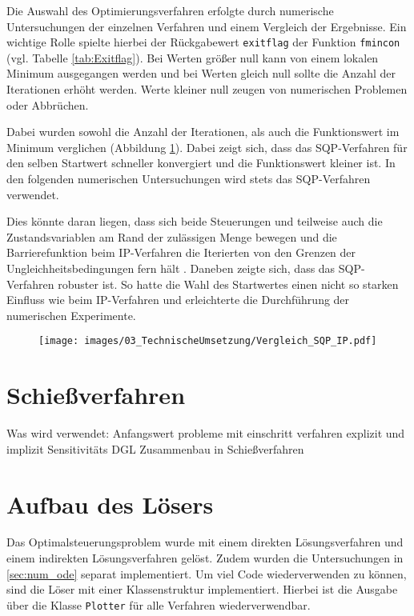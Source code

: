 Die Auswahl des Optimierungsverfahren erfolgte durch numerische Untersuchungen der einzelnen Verfahren und einem Vergleich der Ergebnisse. Ein wichtige Rolle spielte hierbei der Rückgabewert \texttt{exitflag} der Funktion \texttt{fmincon} (vgl. Tabelle \ref{tab:Exitflag}). Bei Werten größer null kann von einem lokalen Minimum ausgegangen werden und bei Werten gleich null sollte die Anzahl der Iterationen erhöht werden. Werte kleiner null zeugen von numerischen Problemen oder Abbrüchen.

 Dabei wurden sowohl die Anzahl der Iterationen, als auch die Funktionswert im Minimum verglichen (Abbildung \ref{img:Vergleich_SQP_IP}). Dabei zeigt sich, dass das SQP-Verfahren für den selben Startwert schneller konvergiert und die Funktionswert kleiner ist. In den folgenden numerischen Untersuchungen wird stets das SQP-Verfahren verwendet.

Dies könnte daran liegen, dass sich beide Steuerungen und teilweise auch die Zustandsvariablen am Rand der zulässigen Menge bewegen und die Barrierefunktion beim IP-Verfahren die Iterierten von den Grenzen der Ungleichheitsbedingungen fern hält \cite{Matlab2016}. Daneben zeigte sich, dass das SQP-Verfahren robuster ist. So hatte die Wahl des Startwertes einen nicht so starken Einfluss wie beim IP-Verfahren und erleichterte die Durchführung der numerischen Experimente. 

\begin{figure}[H]
    \begin{center}
        \texttt{[image: images/03\_TechnischeUmsetzung/Vergleich\_SQP\_IP.pdf]}
         \label{img:Vergleich_SQP_IP}
    \end{center}
\end{figure}

\section{Schießverfahren}

Was wird verwendet:
Anfangswert probleme mit einschritt verfahren explizit und implizit
Sensitivitäts DGL
Zusammenbau in Schießverfahren


\section{Aufbau des Lösers}
Das Optimalsteuerungsproblem wurde mit einem direkten Lösungsverfahren und einem indirekten Lösungsverfahren gelöst. Zudem wurden die Untersuchungen in \autoref{sec:num_ode} separat implementiert. Um viel Code wiederverwenden zu können, sind die Löser mit einer Klassenstruktur implementiert. Hierbei ist die Ausgabe über die Klasse \verb+Plotter+ für alle Verfahren wiederverwendbar.

